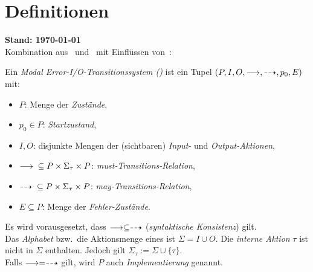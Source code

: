 \chapter{Definitionen}
{\large\textbf{Stand: \today{}}}\\

Kombination aus~\cite{Vogler2015FailSem} und~\cite{Schinko2016BA} mit
Einflüssen von~\cite{Vogler2016MIA3}:

\begin{Def}
  Ein \emph{Modal Error-I/O-Transitionssystem (\MEIO{})} ist ein Tupel
  $(P,I,O,\must,\may,p_0,E)$ mit:
  \begin{itemize}
    \item $P$: Menge der \emph{Zustände},
    \item $p_0\in P$: \emph{Startzustand},
    \item $I,O$: disjunkte Mengen der (sichtbaren) \emph{Input-} und
      \emph{Output-Aktionen},
    \item $\must{} \subseteq P\times \Sigma_{\tau}\times P$:
      \emph{must-Transitions-Relation},
    \item $\may{} \subseteq P\times \Sigma_{\tau}\times P$:
      \emph{may-Transitions-Relation},
    \item $E\subseteq P$: Menge der \emph{Fehler-Zustände}.
  \end{itemize}
  Es wird vorausgesetzt, dass $\must\subseteq\may$ (\emph{syntaktische
  Konsistenz}) gilt.\\
  Das \emph{Alphabet} bzw.\ die Aktionsmenge eines \MEIO{} ist $\Sigma = I\cup
  O$. Die \emph{interne Aktion} $\tau$ ist nicht in $\Sigma$ enthalten. Jedoch
  gilt $\Sigma_{\tau} := \Sigma \cup \{\tau\}$.\\
  Falls $\must =\may$ gilt, wird $P$ auch \emph{Implementierung} genannt.
\end{Def}

